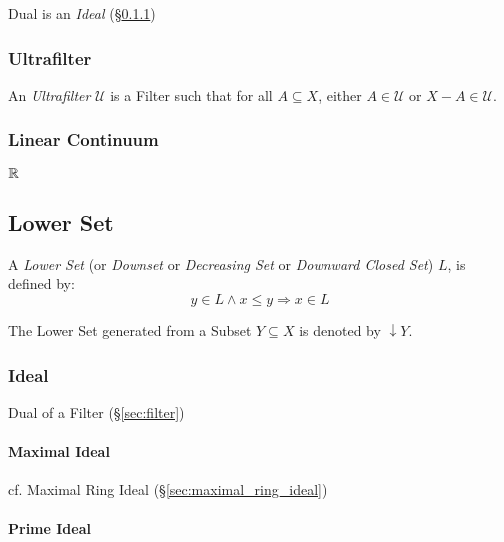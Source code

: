 Dual is an \emph{Ideal} (\S\ref{sec:order_ideal})



\subsubsection{Ultrafilter}\label{sec:ultrafilter}

An \emph{Ultrafilter} $\mathcal{U}$ is a Filter such that for all $A
\subseteq X$, either $A \in \mathcal{U}$ or $X - A \in \mathcal{U}$.



\subsubsection{Linear Continuum}\label{sec:linear_continuum}

$\mathbb{R}$



\subsection{Lower Set}\label{sec:lower_set}

A \emph{Lower Set} (or \emph{Downset} or \emph{Decreasing Set} or
\emph{Downward Closed Set}) $L$, is defined by:
\[
  y \in L \wedge x \leq y \Rightarrow x \in L
\]

The Lower Set generated from a Subset $Y \subseteq X$ is denoted by
$\downarrow Y$.



\subsubsection{Ideal}\label{sec:order_ideal}

Dual of a Filter (\S\ref{sec:filter})



\paragraph{Maximal Ideal}\label{sec:maximal_ideal}\hfill

cf. Maximal Ring Ideal (\S\ref{sec:maximal_ring_ideal})



\paragraph{Prime Ideal}\label{sec:order_prime_ideal}\hfill

